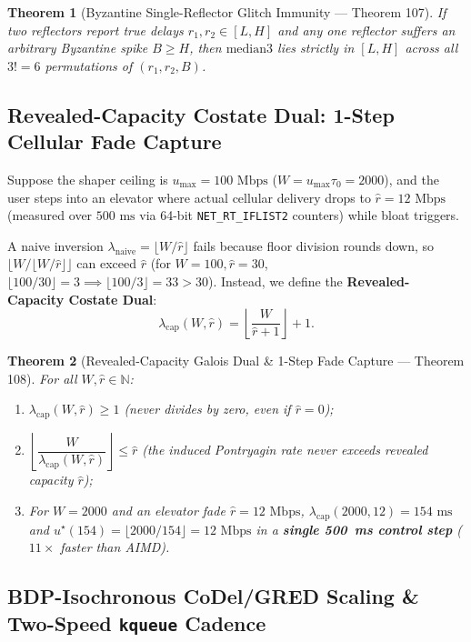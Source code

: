 \documentclass[11pt,a4paper]{article}
\newtheorem{theorem}{Theorem}[section]
\theoremstyle{definition}
\begin{document}
\begin{theorem}[Byzantine Single-Reflector Glitch Immunity --- Theorem 107]
If two reflectors report true delays $r_1, r_2 \in [L, H]$ and any one reflector suffers an arbitrary Byzantine spike $B \ge H$, then $\mathrm{median3}$ lies strictly in $[L, H]$ across all $3! = 6$ permutations of $(r_1, r_2, B)$.
\end{theorem}

\subsection{Revealed-Capacity Costate Dual: 1-Step Cellular Fade Capture}

Suppose the shaper ceiling is $u_{\max} = 100\text{ Mbps}$ ($W = u_{\max}\tau_0 = 2000$), and the user steps into an elevator where actual cellular delivery drops to $\hat{r} = 12\text{ Mbps}$ (measured over $500\text{ ms}$ via 64-bit \texttt{NET\_RT\_IFLIST2} counters) while bloat triggers.

A naive inversion $\lambda_{\mathrm{naive}} = \lfloor W / \hat{r} \rfloor$ fails because floor division rounds down, so $\lfloor W / \lfloor W / \hat{r} \rfloor \rfloor$ can exceed $\hat{r}$ (for $W = 100, \hat{r} = 30$, $\lfloor 100/30 \rfloor = 3 \implies \lfloor 100/3 \rfloor = 33 > 30$). Instead, we define the \textbf{Revealed-Capacity Costate Dual}:
\[
  \lambda_{\mathrm{cap}}(W, \hat{r}) = \left\lfloor \frac{W}{\hat{r} + 1} \right\rfloor + 1.
\]

\begin{theorem}[Revealed-Capacity Galois Dual \& 1-Step Fade Capture --- Theorem 108]
For all $W, \hat{r} \in \mathbb{N}$:
\begin{enumerate}[leftmargin=2em]
  \item $\lambda_{\mathrm{cap}}(W, \hat{r}) \ge 1$ (never divides by zero, even if $\hat{r} = 0$);
  \item $\left\lfloor \dfrac{W}{\lambda_{\mathrm{cap}}(W, \hat{r})} \right\rfloor \le \hat{r}$ (the induced Pontryagin rate never exceeds revealed capacity $\hat{r}$);
  \item For $W = 2000$ and an elevator fade $\hat{r} = 12\text{ Mbps}$, $\lambda_{\mathrm{cap}}(2000, 12) = 154\text{ ms}$ and $u^\star(154) = \lfloor 2000/154 \rfloor = 12\text{ Mbps}$ in a \textbf{single 500~ms control step} ($11\times$ faster than AIMD).
\end{enumerate}
\end{theorem}

\subsection{BDP-Isochronous CoDel/GRED Scaling \& Two-Speed \texttt{kqueue} Cadence}
\end{document}
